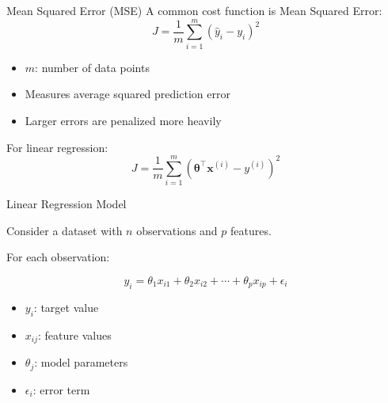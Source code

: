 \documentclass[aspectratio=169]{beamer}
\begin{document}
\begin{frame}{Mean Squared Error (MSE)}
	\small
	A common cost function is Mean Squared Error:
	\[
	J = \frac{1}{m} \sum_{i=1}^{m} (\hat{y}_i - y_i)^2
	\]
	\begin{itemize}
		\item $m$: number of data points
		\item Measures average squared prediction error
		\item Larger errors are penalized more heavily
	\end{itemize}
	\vspace{0.5em}
	For linear regression:
	\[
	J = \frac{1}{m} \sum_{i=1}^{m} (\bm{\theta}^{\top} \mathbf{x}^{(i)} - y^{(i)})^2
	\]
\end{frame}


\begin{frame}{Linear Regression Model}
	
	Consider a dataset with $n$ observations and $p$ features.
	
	\vspace{0.5em}
	
	For each observation:
	
	\[
	y_i =
	\theta_1 x_{i1} +
	\theta_2 x_{i2} +
	\cdots +
	\theta_p x_{ip} +
	\epsilon_i
	\]
	
	\vspace{0.5em}
	
	\begin{itemize}
		\item $y_i$: target value
		\item $x_{ij}$: feature values
		\item $\theta_j$: model parameters
		\item $\epsilon_i$: error term
	\end{itemize}
	
\end{frame}

\end{document}
